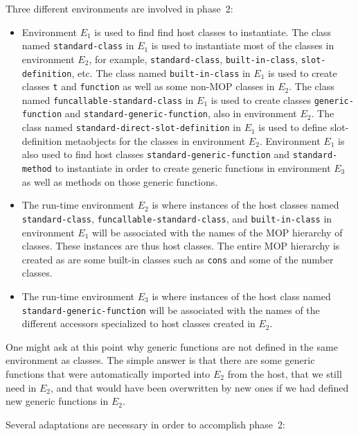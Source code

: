 Three different environments are involved in phase~2:

\begin{itemize}
\item Environment $E_1$ is used to find find host classes to
  instantiate.  The class named \texttt{standard-class} in $E_1$ is
  used to instantiate most of the classes in environment $E_2$, for
  example, \texttt{standard-class}, \texttt{built-in-class},
  \texttt{slot-definition}, etc.  The class named
  \texttt{built-in-class} in $E_1$ is used to create classes
  \texttt{t} and \texttt{function} as well as some non-MOP classes in
  $E_2$.  The class named \texttt{funcallable-standard-class} in $E_1$
  is used to create classes \texttt{generic-function} and
  \texttt{standard-generic-function}, also in environment $E_2$.  The
  class named \texttt{standard-direct-slot-definition} in $E_1$ is
  used to define slot-definition metaobjects for the classes in
  environment $E_2$.  Environment $E_1$ is also used to find host
  classes \texttt{standard-generic-function} and
  \texttt{standard-method} to instantiate in order to create generic
  functions in environment $E_3$ as well as methods on those generic
  functions.
\item The run-time environment $E_2$ is where instances of the host
  classes named \texttt{standard-class},
  \texttt{funcallable-standard-class}, and \texttt{built-in-class} in
  environment $E_1$ will be associated with the names of the MOP
  hierarchy of classes.  These instances are thus host classes.  The
  entire MOP hierarchy is created as are some built-in classes such as
  \texttt{cons} and some of the number classes.
\item The run-time environment $E_3$ is where instances of the host
  class named \texttt{standard-generic-function} will be associated
  with the names of the different accessors specialized to host
  classes created in $E_2$.
\end{itemize}

One might ask at this point why generic functions are not defined in
the same environment as classes.  The simple answer is that there are
some generic functions that were automatically imported into $E_2$
from the host, that we still need in $E_2$, and that would have been
overwritten by new ones if we had defined new generic functions in
$E_2$.

Several adaptations are necessary in order to accomplish phase~2:

